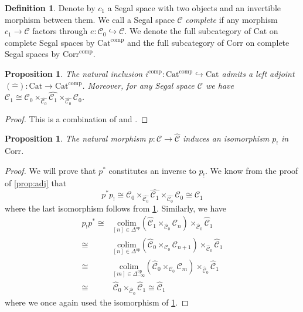 \documentclass[a4paper, reqno]{amsart}
\newtheorem{prop}[theorem]{Proposition}
\theoremstyle{definition}
\newtheorem{defn}[theorem]{Definition}
\newcommand\cC{\mathscr C}
\newcommand\op{\mathrm{op}}
\newcommand\cat{\mathrm{Cat}}
\newcommand\comp{\mathrm{comp}}
\newcommand\colim{\mathrm{colim}}
\newcommand\corr{\mathrm{Corr}}
\begin{document}
\begin{defn}
Denote by $c_1$ a Segal space with two objects and an invertible morphism between them. We call a Segal space $\cC$ \textit{complete} if any morphism $c_1\rightarrow\cC$ factors through $e:\cC_0\hookrightarrow\cC$. We denote the full subcategory of $\mathrm{Cat}$ on complete Segal spaces by $\cat^\comp$ and the full subcategory of $\corr$ on complete Segal spaces by $\corr^\comp$.
\end{defn}
\begin{prop}\label{prop:compl}
The natural inclusion $i^{\mathrm{comp}}:\mathrm{Cat^{comp}}\hookrightarrow\mathrm{Cat}$ admits a left adjoint $(\widehat{-}):\mathrm{Cat}\rightarrow\mathrm{Cat^{comp}}$. Moreover, for any Segal space $\cC$ we have $\cC_1\cong\cC_0\times_{\widehat{\cC_0}}\widehat{\cC_1}\times_{\widehat{\cC_0}}\cC_0$.
\end{prop}
\begin{proof}
This is a combination of \cite[Lemma 1.9]{ayala2018flagged} and \cite[Lemma 1.14]{ayala2018flagged}.
\end{proof}
\begin{prop}\label{prop:univ}
The natural morphism $p:\cC\rightarrow\widehat{\cC}$ induces an isomorphism $p_!$ in $\corr$.
\end{prop}
\begin{proof}
We will prove that $p^*$ constitutes an inverse to $p_!$. We know from the proof of \cref{prop:adj} that 
\[p^*p_!\cong\cC_0\times_{\widehat{\cC_0}}\widehat{\cC_1}\times_{\widehat{\cC_0}}\cC_0\cong \cC_1\]
where the last isomorphism follows from \cref{prop:compl}. Similarly, we have 
\begin{equation*}
    \begin{split}
        p_!p^*\cong&\underset{[n]\in\Delta^\op}{\colim}(\widehat{\cC}_1\times_{\widehat{\cC}_0}\cC_n)\times_{\widehat{\cC}_0}\widehat{\cC}_1\\
        \cong&\underset{[n]\in\Delta^\op}{\colim}(\widehat{\cC}_0\times_{\cC_0}\cC_{n+1})\times_{\widehat{\cC}_0}\widehat{\cC}_1\\
        \cong&\underset{[m]\in\Delta_{-\infty}^\op}{\colim}(\widehat{\cC}_0\times_{\cC_0}\cC_{m})\times_{\widehat{\cC}_0}\widehat{\cC}_1\\
        \cong&\widehat{\cC}_0\times_{\widehat{\cC}_0}\widehat{\cC}_1\cong\widehat{\cC}_1
    \end{split}
\end{equation*}
where we once again used the isomorphism of \cref{prop:compl}.
\end{proof}
\end{document}
